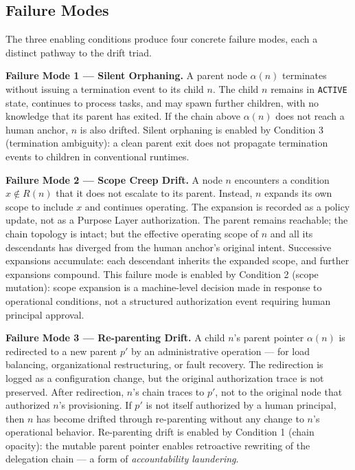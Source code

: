 \subsection{Failure Modes}

The three enabling conditions produce four concrete failure modes, each a distinct pathway to the drift triad.

\medskip
\noindent\textbf{Failure Mode 1 — Silent Orphaning.}
A parent node $\alpha(n)$ terminates without issuing a termination event to its child $n$. The child $n$ remains in \texttt{ACTIVE} state, continues to process tasks, and may spawn further children, with no knowledge that its parent has exited. If the chain above $\alpha(n)$ does not reach a human anchor, $n$ is also drifted. Silent orphaning is enabled by Condition 3 (termination ambiguity): a clean parent exit does not propagate termination events to children in conventional runtimes.

\medskip
\noindent\textbf{Failure Mode 2 — Scope Creep Drift.}
A node $n$ encounters a condition $x \notin R(n)$ that it does not escalate to its parent. Instead, $n$ expands its own scope to include $x$ and continues operating. The expansion is recorded as a policy update, not as a Purpose Layer authorization. The parent remains reachable; the chain topology is intact; but the effective operating scope of $n$ and all its descendants has diverged from the human anchor's original intent. Successive expansions accumulate: each descendant inherits the expanded scope, and further expansions compound. This failure mode is enabled by Condition 2 (scope mutation): scope expansion is a machine-level decision made in response to operational conditions, not a structured authorization event requiring human principal approval.

\medskip
\noindent\textbf{Failure Mode 3 — Re-parenting Drift.}
A child $n$'s parent pointer $\alpha(n)$ is redirected to a new parent $p'$ by an administrative operation — for load balancing, organizational restructuring, or fault recovery. The redirection is logged as a configuration change, but the original authorization trace is not preserved. After redirection, $n$'s chain traces to $p'$, not to the original node that authorized $n$'s provisioning. If $p'$ is not itself authorized by a human principal, then $n$ has become drifted through re-parenting without any change to $n$'s operational behavior. Re-parenting drift is enabled by Condition 1 (chain opacity): the mutable parent pointer enables retroactive rewriting of the delegation chain — a form of \emph{accountability laundering}.

